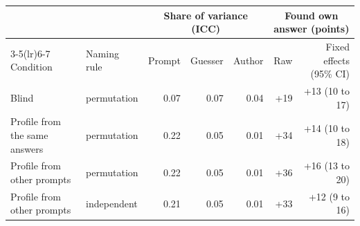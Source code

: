 \begin{tabular}{llrrrrr}
\toprule
& & \multicolumn{3}{c}{Share of variance (ICC)} & \multicolumn{2}{c}{Found own answer (points)} \\
\cmidrule(lr){3-5}\cmidrule(lr){6-7}
Condition & Naming rule & Prompt & Guesser & Author & Raw & Fixed effects (95\% CI) \\
\midrule
Blind & permutation & 0.07 & 0.07 & 0.04 & +19 & +13 (10 to 17) \\
Profile from the same answers & permutation & 0.22 & 0.05 & 0.01 & +34 & +14 (10 to 18) \\
Profile from other prompts & permutation & 0.22 & 0.05 & 0.01 & +36 & +16 (13 to 20) \\
Profile from other prompts & independent & 0.21 & 0.05 & 0.01 & +33 & +12 (9 to 16) \\
\bottomrule
\end{tabular}
